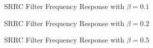 \documentclass{article}
\begin{document}
\begin{figure}[H]
	\centerline{}
	\caption{SRRC Filter Frequency Response with $\beta=0.1$}
	\label{fig::srrc_freq_response_beta_0_1}
\end{figure}

\begin{figure}[H]
	\centerline{}
	\caption{SRRC Filter Frequency Response with $\beta=0.2$}
	\label{fig::srrc_freq_response_beta_0_2}
\end{figure}

\begin{figure}[H]
	\centerline{}
	\caption{SRRC Filter Frequency Response with $\beta=0.5$}
	\label{fig::srrc_freq_response_beta_0_5}
\end{figure}
\end{document}
